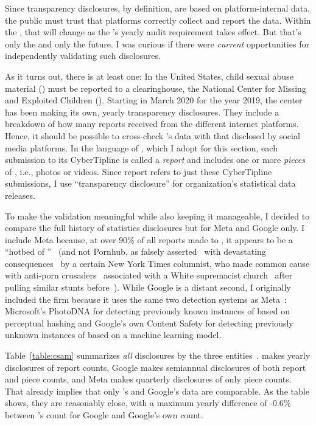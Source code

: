 Since transparency disclosures, by definition, are based on platform-internal
data, the public must trust that platforms correctly collect and report the
data. Within the , that will change as the 's yearly audit requirement
takes effect. But that's only the  and only the future. I was curious if
there were \emph{current} opportunities for independently validating such
disclosures.

As it turns out, there is at least one: In the United States, child sexual abuse
material () must be reported to a clearinghouse, the National Center for
Missing and Exploited Children (). Starting in March 2020 for the year
2019, the center has been making its own, yearly transparency disclosures. They
include a breakdown of how many reports  received from the different
internet platforms. Hence, it should be possible to cross-check 's data
with that disclosed by social media platforms. In the language of , which
I adopt for this section, each submission to its CyberTipline is called a
\emph{report} and includes one or more \emph{pieces} of , i.e., photos or
videos. Since report refers to just these CyberTipline submissions, I use
``transparency disclosure'' for organization's statistical data releases.

To make the validation meaningful while also keeping it manageable, I decided to
compare the full history of  statistics disclosures but for Meta and
Google only. I include Meta because, at over 90\% of all reports made to ,
it appears to be a ``hotbed of ''~\cite{Hitt2021} (and not Pornhub, as
falsely asserted~\cite{Brown2020,Grant2020} with devastating
consequences~\cite{Celarier2021,Dickson2020,Harris2021,Stoya2021,GagliardoSilver2021}
by a certain New York Times columnist, who made common cause with anti-porn
crusaders~\cite{Hitt2020a} associated with a White supremacist
church~\cite{Halley2021,ProducerX2020} after pulling similar stunts
before~\cite{Bass2014,Brown2019,Dickson2014,Martin2012,Masnick2017,McCormack2012,Talusan2017}).
While Google is a distant second, I originally included the firm because it uses
the same two  detection systems as Meta~\cite{Allen2011,Davis2018}:
Microsoft's PhotoDNA for detecting previously known instances of  based on
perceptual hashing and Google's own Content Safety  for detecting
previously unknown instances of  based on a machine learning model.

Table~\ref{table:csam} summarizes \emph{all}  disclosures by the three
entities~\cite{NcmecByPlatform2019,NcmecByPlatform2020,NcmecByPlatform2021}.
 makes yearly disclosures of report counts, Google makes semiannual
disclosures of both report and piece counts, and Meta makes quarterly
disclosures of only piece counts. That already implies that only 's and
Google's data are comparable. As the table shows, they are reasonably close,
with a maximum yearly difference of -0.6\% between 's count for Google and
Google's own count.

